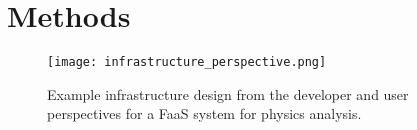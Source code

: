 \section{Methods}\label{sec:methods}
%

%


%
\begin{figure}[!htpb]
    \centering
    \texttt{[image: infrastructure\_perspective.png]}
    \caption{Example infrastructure design from the developer and user perspectives for a FaaS system for physics analysis.~\cite{portable_inference_workshop}}
    \label{fig:infrastructure_perspective}
\end{figure}
